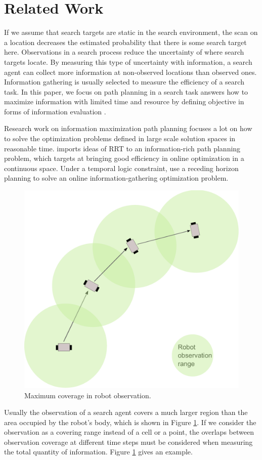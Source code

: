 \section{Related Work}
\label{sec:related_work}

If we assume that search targets are static in the search environment, the scan on a location decreases the estimated probability that there is some search target here.
Observations in a search process reduce the uncertainty of where search targets locate.
By measuring this type of uncertainty with information, a search agent can collect more information at non-observed locations than observed ones.
Information gathering is usually selected to measure the efficiency of a search task.
In this paper, we focus on path planning in a search task answers how to maximize information with limited time and resource by defining objective in forms of information evaluation \cite{goodrich2013toward}.

Research work on information maximization path planning focuses a lot on how to solve the optimization problems defined in large scale solution spaces in reasonable time.
\cite{levine2010information} imports ideas of RRT to an information-rich path planning problem, which targets at bringing good efficiency in online optimization in a continuous space.
Under a temporal logic constraint, \cite{JonesSchwagerBeltaICRA13scLTLInfo} use a receding horizon planning to solve an online information-gathering optimization problem.

\begin{figure}
\centering
\includegraphics[width=0.4\linewidth]{./images/robotObservation.pdf}
\caption{Maximum coverage in robot observation.}
\label{fig:robotObservation}
\end{figure}

Usually the observation of a search agent covers a much larger region than the area occupied by the robot's body, which is shown in Figure \ref{fig:robotObservation}.
If we consider the observation as a covering range instead of a cell or a point, the overlaps between observation coverage at different time steps must be considered when measuring the total quantity of information.
Figure \ref{fig:robotObservation} gives an example.

